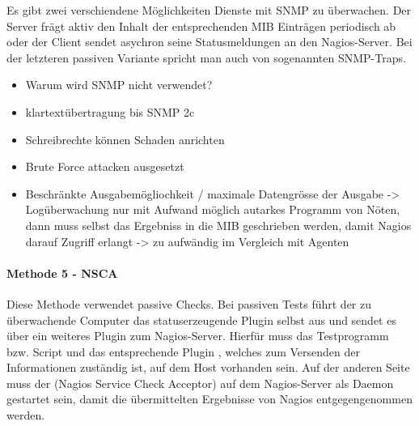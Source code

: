Es gibt zwei verschiendene Möglichkeiten Dienste mit \gls{SNMP} zu überwachen.
Der Server frägt aktiv den Inhalt der entsprechenden MIB Einträgen periodisch ab oder der Client sendet asychron seine Statusmeldungen an den Nagios-Server.
Bei der letzteren passiven Variante spricht man auch von sogenannten \gls{SNMP}-Traps.


\begin{itemize}
\item Warum wird SNMP nicht verwendet?
\item klartextübertragung bis SNMP 2c
\item Schreibrechte können Schaden anrichten
\item Brute Force attacken ausgesetzt
\item Beschränkte Ausgabemögliochkeit / maximale Datengrösse der Ausgabe -> Logüberwachung nur mit Aufwand möglich autarkes Programm von Nöten, dann muss selbst das Ergebniss in die MIB geschrieben werden, damit Nagios darauf Zugriff erlangt -> zu aufwändig im Vergleich mit Agenten
\end{itemize}




\paragraph{Methode 5 - NSCA}
Diese Methode verwendet passive Checks.
Bei passiven Tests führt der zu überwachende Computer das statuserzeugende Plugin selbst aus und sendet es über ein weiteres Plugin zum Nagios-Server.
Hierfür muss das Testprogramm bzw. Script und das entsprechende Plugin , welches zum Versenden der Informationen zuständig ist, auf dem Host vorhanden sein.
Auf der anderen Seite muss der  (Nagios Service Check Acceptor) auf dem Nagios-Server als Daemon gestartet sein, damit die übermittelten Ergebnisse von Nagios entgegengenommen werden.


